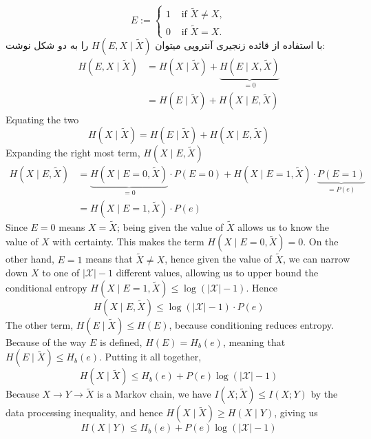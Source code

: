 $$
E:= \begin{cases}1 & \text { if } \tilde{X} \neq X, \\ 0 & \text { if } \tilde{X}=X .\end{cases}
$$
با استفاده از قائده زنجیری آنتروپی میتوان
$ H(E, X \mid \tilde{X})$
را به دو شکل نوشت:
$$
\begin{aligned}
    H(E, X \mid \tilde{X}) &=H(X \mid \tilde{X})+\underbrace{H(E \mid X, \tilde{X})}_{=0} \\
    &=H(E \mid \tilde{X})+H(X \mid E, \tilde{X})
\end{aligned}
$$
Equating the two
$$
H(X \mid \tilde{X})=H(E \mid \tilde{X})+H(X \mid E, \tilde{X})
$$
Expanding the right most term, $H(X \mid E, \tilde{X})$
$$
\begin{aligned}
    H(X \mid E, \tilde{X}) &=\underbrace{H(X \mid E=0, \tilde{X})}_{=0} \cdot P(E=0)+H(X \mid E=1, \tilde{X}) \cdot \underbrace{P(E=1)}_{=P(e)} \\
    &=H(X \mid E=1, \tilde{X}) \cdot P(e)
\end{aligned}
$$
Since $E=0$ means $X=\tilde{X}$; being given the value of $\tilde{X}$ allows us to know the value of $X$ with certainty. This makes the term $H(X \mid E=0, \tilde{X})=0$. On the other hand, $E=1$ means that $\tilde{X} \neq X$, hence given the value of $\tilde{X}$, we can narrow down $X$ to one of $|\mathcal{X}|-1$ different values, allowing us to upper bound the conditional entropy $H(X \mid E=1, \tilde{X}) \leq \log (|\mathcal{X}|-1)$. Hence
$$
H(X \mid E, \tilde{X}) \leq \log (|\mathcal{X}|-1) \cdot P(e)
$$
The other term, $H(E \mid \tilde{X}) \leq H(E)$, because conditioning reduces entropy. Because of the way $E$ is defined, $H(E)=H_b(e)$, meaning that $H(E \mid \tilde{X}) \leq H_b(e)$. Putting it all together,
$$
H(X \mid \tilde{X}) \leq H_b(e)+P(e) \log (|\mathcal{X}|-1)
$$
Because $X \rightarrow Y \rightarrow \tilde{X}$ is a Markov chain, we have $I(X ; \tilde{X}) \leq I(X ; Y)$ by the data processing inequality, and hence $H(X \mid \tilde{X}) \geq H(X \mid Y)$, giving us
$$
H(X \mid Y) \leq H_b(e)+P(e) \log (|\mathcal{X}|-1)
$$
